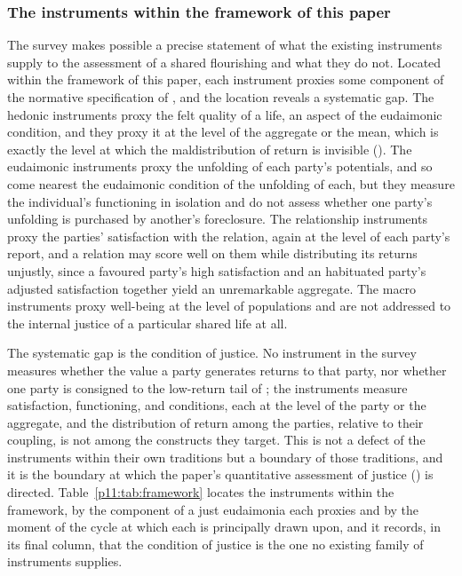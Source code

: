 \subsubsection{The instruments within the framework of this paper}
\label{p11:sec:ev-instr-frame}

The survey makes possible a precise statement of what the existing instruments supply to the assessment of a shared flourishing and what they do not. Located within the framework of this paper, each instrument proxies some component of the normative specification of , and the location reveals a systematic gap. The hedonic instruments proxy the felt quality of a life, an aspect of the eudaimonic condition, and they proxy it at the level of the aggregate or the mean, which is exactly the level at which the maldistribution of return is invisible (). The eudaimonic instruments proxy the unfolding of each party's potentials, and so come nearest the eudaimonic condition of the unfolding of each, but they measure the individual's functioning in isolation and do not assess whether one party's unfolding is purchased by another's foreclosure. The relationship instruments proxy the parties' satisfaction with the relation, again at the level of each party's report, and a relation may score well on them while distributing its returns unjustly, since a favoured party's high satisfaction and an habituated party's adjusted satisfaction together yield an unremarkable aggregate. The macro instruments proxy well-being at the level of populations and are not addressed to the internal justice of a particular shared life at all.

The systematic gap is the condition of justice. No instrument in the survey measures whether the value a party generates returns to that party, nor whether one party is consigned to the low-return tail of ; the instruments measure satisfaction, functioning, and conditions, each at the level of the party or the aggregate, and the distribution of return among the parties, relative to their coupling, is not among the constructs they target. This is not a defect of the instruments within their own traditions but a boundary of those traditions, and it is the boundary at which the paper's quantitative assessment of justice () is directed. Table~\ref{p11:tab:framework} locates the instruments within the framework, by the component of a just eudaimonia each proxies and by the moment of the cycle at which each is principally drawn upon, and it records, in its final column, that the condition of justice is the one no existing family of instruments supplies.

